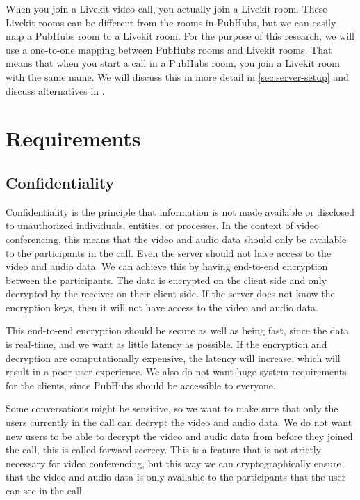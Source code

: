 \documentclass{report}
\begin{document}
When you join a Livekit video call, you actually join a Livekit room.
These Livekit rooms can be different from the rooms in PubHubs, but we can easily map a PubHubs room to a Livekit room.
For the purpose of this research, we will use a one-to-one mapping between PubHubs rooms and Livekit rooms. That means
that when you start a call in a PubHubs room, you join a Livekit room with the same name. We will discuss this in more
detail in \autoref{sec:server-setup} and discuss alternatives in .

\chapter{Requirements}\label{chap:requirements}

\section{Confidentiality}
Confidentiality is the principle that information is not made available or disclosed to unauthorized individuals,
entities, or processes. In the context of video conferencing, this means that the video and audio data should only
be available to the participants in the call. Even the server should not have access to the video and audio data. We
can achieve this by having end-to-end encryption between the participants. The data is encrypted on the client side and
only decrypted by the receiver on their client side. If the server does not know the encryption keys, then it will
not have access to the video and audio data.

This end-to-end encryption should be secure as well as being fast, since the data is real-time, and we want as little
latency as possible. If the encryption and decryption are computationally expensive, the latency will increase,
which will result in a poor user experience. We also do not want huge system requirements for the clients, since
PubHubs should be accessible to everyone.

Some conversations might be sensitive, so we want to make sure that only the users currently in the call can
decrypt the video and audio data. We do not want new users to be able to decrypt the video and audio data from
before they joined the call, this is called forward secrecy. This is a feature that is not strictly necessary for
video conferencing, but this way we can cryptographically ensure that the video and audio data is only available to
the participants that the user can see in the call.
\end{document}
